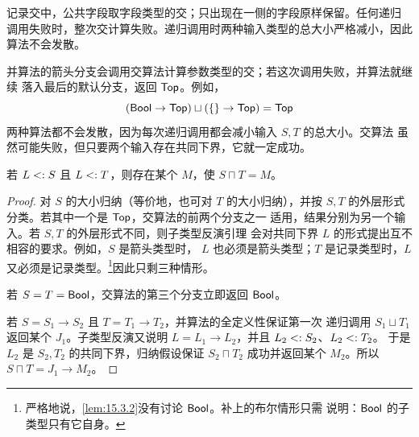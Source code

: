 \begin{taplauthorsolutionentrybox}

记录交中，公共字段取字段类型的交；只出现在一侧的字段原样保留。任何递归
调用失败时，整次交计算失败。递归调用时两种输入类型的总大小严格减小，因此
算法不会发散。

并算法的箭头分支会调用交算法计算参数类型的交；若这次调用失败，并算法就继续
落入最后的默认分支，返回 \(\mathsf{Top}\)。例如，
\[
 (\mathsf{Bool}\to\mathsf{Top})\sqcup
 (\{\}\to\mathsf{Top})=\mathsf{Top}
\]
两种算法都不会发散，因为每次递归调用都会减小输入 \(S,T\) 的总大小。交算法
虽然可能失败，但只要两个输入存在共同下界，它就一定成功。

\setcounter{taplappendixlemma}{9}
\begin{taplappendixlemma}
\label{lem:appendix-a10}
若 \(L\mathrel{<:} S\) 且 \(L\mathrel{<:} T\)，则存在某个 \(M\)，使
\(S\sqcap T=M\)。
\end{taplappendixlemma}

\begin{proof}
对 \(S\) 的大小归纳（等价地，也可对 \(T\) 的大小归纳），并按 \(S,T\)
的外层形式分类。若其中一个是 \(\mathsf{Top}\)，交算法的前两个分支之一
适用，结果分别为另一个输入。若 \(S,T\) 的外层形式不同，则子类型反演引理
会对共同下界 \(L\) 的形式提出互不相容的要求。例如，\(S\) 是箭头类型时，
\(L\) 也必须是箭头类型；\(T\) 是记录类型时，\(L\) 又必须是记录类型。\footnote{
严格地说，\cref{lem:15.3.2}没有讨论 \(\mathsf{Bool}\)。补上的布尔情形只需
说明：\(\mathsf{Bool}\) 的子类型只有它自身。}因此只剩三种情形。

若 \(S=T=\mathsf{Bool}\)，交算法的第三个分支立即返回
\(\mathsf{Bool}\)。

若 \(S=S_1\to S_2\) 且 \(T=T_1\to T_2\)，并算法的全定义性保证第一次
递归调用 \(S_1\sqcup T_1\) 返回某个 \(J_1\)。子类型反演又说明
\(L=L_1\to L_2\)，并且 \(L_2\mathrel{<:} S_2\)、\(L_2\mathrel{<:} T_2\)。
于是 \(L_2\) 是 \(S_2,T_2\) 的共同下界，归纳假设保证
\(S_2\sqcap T_2\) 成功并返回某个 \(M_2\)。所以
\(S\sqcap T=J_1\to M_2\)。


\end{proof}
\end{taplauthorsolutionentrybox}
